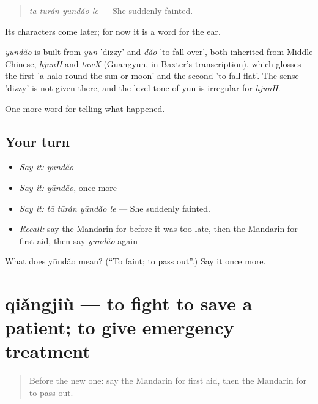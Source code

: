 \begin{quote}
\emph{tā tūrán yūndǎo le} — She suddenly fainted.
\end{quote}

Its characters come later; for now it is a word for the ear.

\begin{cousinweb}
\emph{yūndǎo} is built from \emph{yūn} 'dizzy' and \emph{dǎo} 'to fall over', both inherited from Middle Chinese, \emph{hjunH} and \emph{tawX} (Guangyun, in Baxter's transcription), which glosses the first 'a halo round the sun or moon' and the second 'to fall flat'. The sense 'dizzy' is not given there, and the level tone of yūn is irregular for \emph{hjunH}.
\end{cousinweb}

\begin{grammarlens}[title={What you've built}]
One more word for telling what happened.
\end{grammarlens}

\subsection*{Your turn}
\begin{itemize}
\raggedright
  \item \emph{Say it:} \emph{yūndǎo}
  \item \emph{Say it:} \emph{yūndǎo}, once more
  \item \emph{Say it:} \emph{tā tūrán yūndǎo le} — She suddenly fainted.
  \item \emph{Recall:} say the Mandarin for before it was too late, then the Mandarin for first aid, then say \emph{yūndǎo} again
\end{itemize}

\begin{tcolorbox}[breakable,colback=teal!4,colframe=teal!35!black,title={Before you move on}]
What does yūndǎo mean? (\textquotedblleft{}To faint; to pass out\textquotedblright{}.) Say it once more.
\end{tcolorbox}
\section[qiǎngjiù]{qiǎngjiù — to fight to save a patient; to give emergency treatment}

\label{lesson:ZH-C299-qiangjiu}



\begin{quote}
Before the new one: say the Mandarin for first aid, then the Mandarin for to pass out.
\end{quote}

